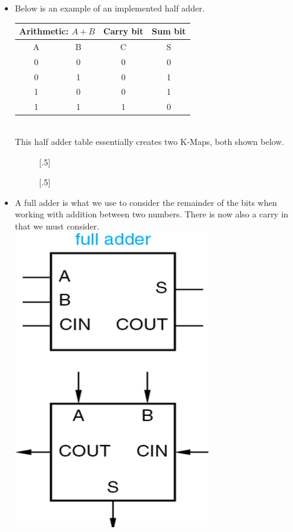 \documentclass[10pt,a4paper]{article}
\begin{document}
\begin{itemize}
\item Below is an example of an implemented half adder.\\
\begin{tabular}{cc|cc}
\multicolumn{2}{c|}{Arithmetic: $A+B$} & Carry bit & Sum bit \\ 
\hline 
A & B & C & S \\ 
\hline 
0 & 0 & 0 & 0 \\ 
0 & 1 & 0 & 1 \\ 
1 & 0 & 0 & 1 \\ 
1 & 1 & 1 & 0 \\ 
\end{tabular}\\
This half adder table essentially creates two K-Maps, both shown below.
\begin{figure}[h]
\captionsetup[subfigure]{font=footnotesize}
[.5\textwidth]{
}
[.5\textwidth]
{}
\end{figure}
\item A full adder is what we use to consider the remainder of the bits when working with addition between two numbers. There is now also a carry in that we must consider.\\
\includegraphics[scale=.7]{IMG5}

\end{itemize}
\end{document}
